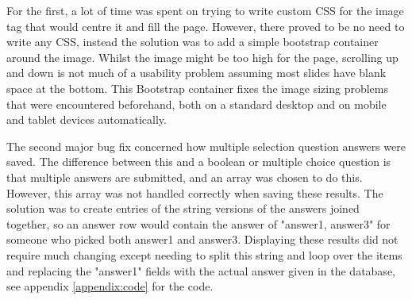 For the first, a lot of time was spent on trying to write custom CSS for the image tag that would centre it and fill the page. However, there proved to be no need to write any CSS, instead the solution was to add a simple bootstrap container around the image. Whilst the image might be too high for the page, scrolling up and down is not much of a usability problem assuming most slides have blank space at the bottom. This Bootstrap container fixes the image sizing problems that were encountered beforehand, both on a standard desktop and on mobile and tablet devices automatically.

The second major bug fix concerned how multiple selection question answers were saved. The difference between this and a boolean or multiple choice question is that multiple answers are submitted, and an array was chosen to do this. However, this array was not handled correctly when saving these results. The solution was to create entries of the string versions of the answers joined together, so an answer row would contain the answer of "answer1, answer3" for someone who picked both answer1 and answer3. Displaying these results did not require much changing except needing to split this string and loop over the items and replacing the "answer1" fields with the actual answer given in the database, see appendix \ref{appendix:code} for the code.
\newpage